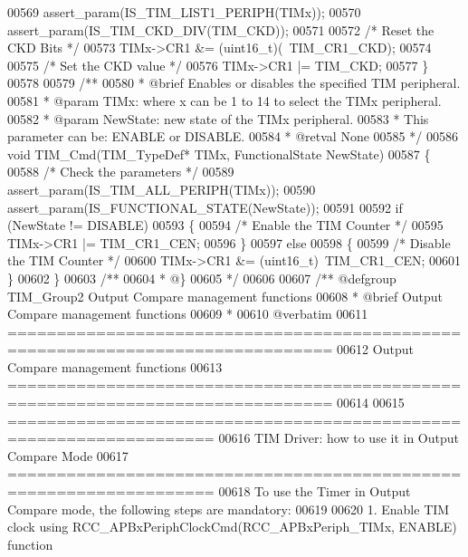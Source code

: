 \begin{DoxyCode}
00569   assert_param(IS\_TIM\_LIST1\_PERIPH(TIMx));
00570   assert_param(IS\_TIM\_CKD\_DIV(TIM\_CKD));
00571 
00572   \textcolor{comment}{/* Reset the CKD Bits */}
00573   TIMx->CR1 &= (uint16\_t)(~TIM_CR1_CKD);
00574 
00575   \textcolor{comment}{/* Set the CKD value */}
00576   TIMx->CR1 |= TIM\_CKD;
00577 \}
00578 
00579 \textcolor{comment}{/**}
00580 \textcolor{comment}{  * @brief  Enables or disables the specified TIM peripheral.}
00581 \textcolor{comment}{  * @param  TIMx: where x can be 1 to 14 to select the TIMx peripheral.}
00582 \textcolor{comment}{  * @param  NewState: new state of the TIMx peripheral.}
00583 \textcolor{comment}{  *          This parameter can be: ENABLE or DISABLE.}
00584 \textcolor{comment}{  * @retval None}
00585 \textcolor{comment}{  */}
00586 \textcolor{keywordtype}{void} TIM_Cmd(TIM\_TypeDef* TIMx, FunctionalState NewState)
00587 \{
00588   \textcolor{comment}{/* Check the parameters */}
00589   assert_param(IS\_TIM\_ALL\_PERIPH(TIMx));
00590   assert_param(IS\_FUNCTIONAL\_STATE(NewState));
00591 
00592   \textcolor{keywordflow}{if} (NewState != DISABLE)
00593   \{
00594     \textcolor{comment}{/* Enable the TIM Counter */}
00595     TIMx->CR1 |= TIM_CR1_CEN;
00596   \}
00597   \textcolor{keywordflow}{else}
00598   \{
00599     \textcolor{comment}{/* Disable the TIM Counter */}
00600     TIMx->CR1 &= (uint16\_t)~TIM_CR1_CEN;
00601   \}
00602 \}
00603 \textcolor{comment}{/**}
00604 \textcolor{comment}{  * @\}}
00605 \textcolor{comment}{  */}
00606 
00607 \textcolor{comment}{/** @defgroup TIM\_Group2 Output Compare management functions}
00608 \textcolor{comment}{ *  @brief    Output Compare management functions }
00609 \textcolor{comment}{ *}
00610 \textcolor{comment}{@verbatim   }
00611 \textcolor{comment}{ ===============================================================================}
00612 \textcolor{comment}{                        Output Compare management functions}
00613 \textcolor{comment}{ ===============================================================================  }
00614 \textcolor{comment}{   }
00615 \textcolor{comment}{       ===================================================================      }
00616 \textcolor{comment}{              TIM Driver: how to use it in Output Compare Mode}
00617 \textcolor{comment}{       =================================================================== }
00618 \textcolor{comment}{       To use the Timer in Output Compare mode, the following steps are mandatory:}
00619 \textcolor{comment}{       }
00620 \textcolor{comment}{       1. Enable TIM clock using RCC\_APBxPeriphClockCmd(RCC\_APBxPeriph\_TIMx, ENABLE) function}

\end{DoxyCode}
